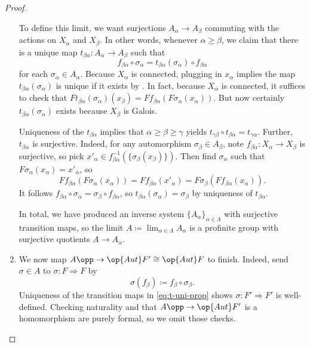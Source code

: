 \documentclass{amsart}
\begin{document}
\begin{proof}
\begin{enumerate}
        To define this limit, we want surjections $A_\alpha\to A_\beta$ commuting with the actions on $X_\alpha$ and $X_\beta$. In other words, whenever $\alpha\ge\beta$, we claim that there is a unique map $t_{\beta\alpha}\colon A_\alpha\to A_\beta$ such that
        \begin{equation}
            f_{\beta\alpha}\circ\sigma_\alpha=t_{\beta\alpha}(\sigma_\alpha)\circ f_{\beta\alpha} \label{eq:t-uni-prop}
        \end{equation}
        for each $\sigma_\alpha\in A_\alpha$. Because $X_\alpha$ is connected, plugging in $x_\alpha$ implies the map $t_{\beta\alpha}(\sigma_\alpha)$ is unique if it exists by . In fact, because $X_\alpha$ is connected, it suffices to check that $Ft_{\beta\alpha}(\sigma_\alpha)(x_\beta)=Ff_{\beta\alpha}(F\sigma_\alpha(x_\alpha))$. But now certainly $t_{\beta\alpha}(\sigma_\alpha)$ exists because $X_\beta$ is Galois.

        Uniqueness of the $t_{\beta\alpha}$ implies that $\alpha\ge\beta\ge\gamma$ yields $t_{\gamma\beta}\circ t_{\beta\alpha}=t_{\gamma\alpha}$. Further, $t_{\beta\alpha}$ is surjective. Indeed, for any automorphism $\sigma_\beta\in A_\beta$, note $f_{\beta\alpha}\colon X_\alpha\to X_\beta$ is surjective, so pick $x'_\alpha\in f_{\beta\alpha}^{-1}(\{\sigma_\beta(x_\beta)\})$. Then find $\sigma_\alpha$ such that $F\sigma_\alpha(x_\alpha)=x'_\alpha$, so
        \[Ff_{\beta\alpha}(F\sigma_\alpha(x_\alpha))=Ff_{\beta\alpha}(x'_\alpha)=F\sigma_\beta(Ff_{\beta\alpha}(x_\alpha)).\]
        It follows $f_{\beta\alpha}\circ\sigma_\alpha=\sigma_\beta\circ f_{\beta\alpha}$, so $t_{\beta\alpha}(\sigma_\alpha)=\sigma_\beta$ by uniqueness of $t_{\beta\alpha}$.

        In total, we have produced an inverse system $\{A_\alpha\}_{\alpha\in\Lambda}$ with surjective transition maps, so the limit $A\coloneqq\lim_{\alpha\in\Lambda}A_\alpha$ is a profinite group with surjective quotients $A\to A_\alpha$.

        \item We now map $A\opp\to\op{Aut}F'\cong\op{Aut}F$ to finish. Indeed, send $\sigma\in A$ to $\sigma\colon F\Rightarrow F$ by
        \[\sigma(f_\beta)\coloneqq f_\beta\circ\sigma_\beta.\]
        Uniqueness of the transition maps in \eqref{eq:t-uni-prop} shows $\sigma\colon F'\Rightarrow F'$ is well-defined. Checking naturality and that $A\opp\to\op{Aut}F'$ is a homomorphism are purely formal, so we omit those checks.


\end{enumerate}
\end{proof}
\end{document}
